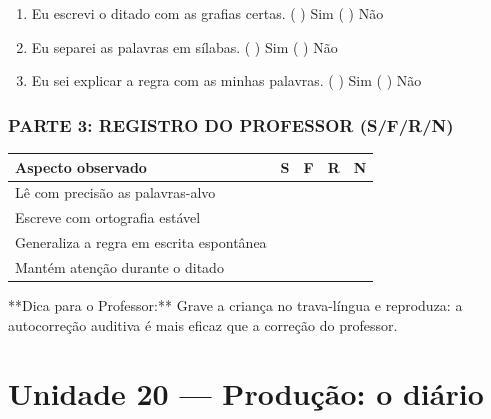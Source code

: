 \begin{exercicio}
\begin{enumerate}[label=\alph*)]
  \item Eu escrevi o ditado com as grafias certas.  \quad ( ) Sim   ( ) Não

  \item Eu separei as palavras em sílabas.  \quad ( ) Sim   ( ) Não

  \item Eu sei explicar a regra com as minhas palavras.  \quad ( ) Sim   ( ) Não

\end{enumerate}

\subsection*{PARTE 3: REGISTRO DO PROFESSOR (S/F/R/N)}

\begin{center}
\renewcommand{\arraystretch}{1.4}
\begin{tabular}{@{}p{9cm}cccc@{}}
\toprule
Aspecto observado & S & F & R & N \\
\midrule
Lê com precisão as palavras-alvo & & & & \\
Escreve com ortografia estável & & & & \\
Generaliza a regra em escrita espontânea & & & & \\
Mantém atenção durante o ditado & & & & \\
\bottomrule\end{tabular}\end{center}

\end{exercicio}

\begin{dica}
**Dica para o Professor:** Grave a criança no trava-língua e reproduza: a autocorreção auditiva é mais eficaz que a correção do professor.
\end{dica}


\chapter{Unidade 20 --- Produção: o diário}


